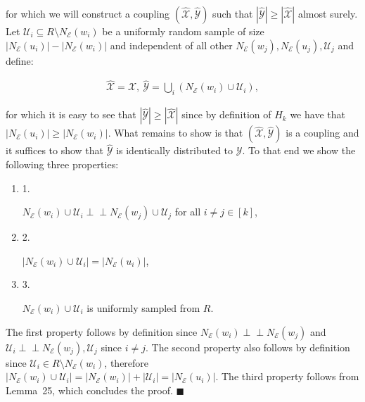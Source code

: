 for which we will construct a coupling $(\hat{\mathcal{X}},\hat{\mathcal{Y}})$ such that $|\hat{\mathcal{Y}}|\geq|\hat{\mathcal{X}}|$ almost surely.
Let $\mathcal{U}_{i}\subseteq R\setminus N_{\mathcal{E}}(w_{i})$ be a uniformly random sample of size $|N_{\mathcal{E}}(u_{i})|-|N_{\mathcal{E}}(w_{i})|$ and independent of all other $N_{\mathcal{E}}(w_{j}),N_{\mathcal{E}}(u_{j}),\mathcal{U}_{j}$ and define:\par


\[\begin{gathered}
\displaystyle\hat{\mathcal{X}}=\mathcal{X},\ \hat{\mathcal{Y}}=\bigcup_{i}\left(N_{\mathcal{E}}(w_{i})\cup\mathcal{U}_{i}\right),
\end{gathered}\]


for which it is easy to see that $|\hat{\mathcal{Y}}|\geq|\hat{\mathcal{X}}|$ since by definition of $H_{k}$ we have that $|N_{\mathcal{E}}(u_{i})|\geq|N_{\mathcal{E}}(w_{i})|$.
What remains to show is that $(\hat{\mathcal{X}},\hat{\mathcal{Y}})$ is a coupling and it suffices to show that $\hat{\mathcal{Y}}$ is identically distributed to $\mathcal{Y}$.
To that end we show the following three properties:\par


\begin{enumerate}


\item[] 1. 


$N_{\mathcal{E}}(w_{i})\cup\mathcal{U}_{i}\perp\!\!\!\!\perp N_{\mathcal{E}}(w_{j})\cup\mathcal{U}_{j}$ for all $i\neq j\in[k]$,\par




\item[] 2. 


$|N_{\mathcal{E}}(w_{i})\cup\mathcal{U}_{i}|=|N_{\mathcal{E}}(u_{i})|$,\par




\item[] 3. 


$N_{\mathcal{E}}(w_{i})\cup\mathcal{U}_{i}$ is uniformly sampled from $R$.\par




\end{enumerate}


The first property follows by definition since $N_{\mathcal{E}}(w_{i})\perp\!\!\!\!\perp N_{\mathcal{E}}(w_{j})$ and $\mathcal{U}_{i}\perp\!\!\!\!\perp N_{\mathcal{E}}(w_{j}),\mathcal{U}_{j}$ since $i\neq j$.
The second property also follows by definition since $\mathcal{U}_{i}\in R\setminus N_{\mathcal{E}}(w_{i})$, therefore $|N_{\mathcal{E}}(w_{i})\cup\mathcal{U}_{i}|=|N_{\mathcal{E}}(w_{i})|+|\mathcal{U}_{i}|=|N_{\mathcal{E}}(u_{i})|$.
The third property follows from Lemma 25, which concludes the proof.
\ensuremath{\blacksquare}\par






